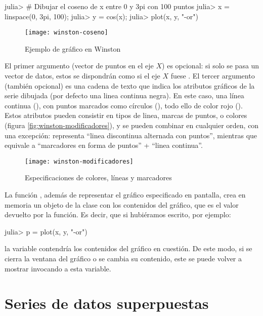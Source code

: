 \begin{jlconcode}
julia> # Dibujar el coseno de x entre 0 y 3pi con 100 puntos
julia> x = linspace(0, 3pi, 100);
julia> y = cos(x);
julia> plot(x, y, "-or")
\end{jlconcode}

\begin{figure}
\centering
\texttt{[image: winston-coseno]}
\caption{Ejemplo de gráfico en Winston}
\label{fig:winston-coseno}
\end{figure}

El primer argumento (vector de puntos en el eje $X$) es opcional: si solo se pasa un vector de datos, estos se dispondrán como si el eje $X$ fuese \code{[1:length(y)]}. El tercer argumento (también opcional) es una cadena de texto que indica los atributos gráficos de la serie dibujada (por defecto una linea continua negra). En este caso, una línea continua (), con puntos marcados como círculos (), todo ello de color rojo (). Estos atributos pueden consistir en tipos de linea, marcas de puntos, o colores (figura \ref{fig:winston-modificadores}), y se pueden combinar en cualquier orden, con una excepción:  representa ``linea discontinua alternada con puntos'', mientras que  equivale a ``marcadores en forma de puntos'' + ``linea continua''.

\begin{figure}
\centering
\texttt{[image: winston-modificadores]}
\caption{Especificaciones de colores, líneas y marcadores}
\label{fig:winston-specs}
\end{figure}


La función , además de representar el gráfico especificado en pantalla, crea en memoria un objeto de la clase  con los contenidos del gráfico, que es el valor devuelto por la función. Es decir, que si hubiéramos escrito, por ejemplo:

\begin{jlconcode}
julia> p = plot(x, y, "-or")
\end{jlconcode}

la variable  contendría los contenidos del gráfico en cuestión. De este modo, si se cierra la ventana del gráfico o se cambia su contenido, este se puede volver a mostrar invocando a esta variable.

\section{Series de datos superpuestas}

